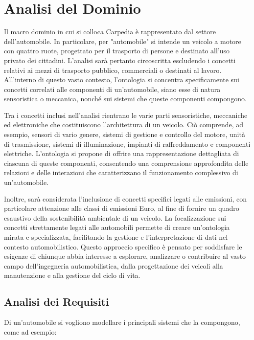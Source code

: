 \chapter{Analisi del Dominio}

Il macro dominio in cui si colloca Carpedia è rappresentato dal settore dell'automobile. In particolare, per "automobile" si intende un veicolo a motore con quattro ruote, progettato per il trasporto di persone e destinato all'uso privato dei cittadini. L'analisi sarà pertanto circoscritta escludendo i concetti relativi ai mezzi di trasporto pubblico, commerciali o destinati al lavoro. All'interno di questo vasto contesto, l'ontologia si concentra specificamente sui concetti correlati alle componenti di un'automobile, siano esse di natura sensoristica o meccanica, nonché sui sistemi che queste componenti compongono.

Tra i concetti inclusi nell'analisi rientrano le varie parti sensoristiche, meccaniche ed elettroniche che costituiscono l'architettura di un veicolo. Ciò comprende, ad esempio, sensori di vario genere, sistemi di gestione e controllo del motore, unità di trasmissione, sistemi di illuminazione, impianti di raffreddamento e componenti elettriche. L'ontologia si propone di offrire una rappresentazione dettagliata di ciascuna di queste componenti, consentendo una comprensione approfondita delle relazioni e delle interazioni che caratterizzano il funzionamento complessivo di un'automobile.

Inoltre, sarà considerata l'inclusione di concetti specifici legati alle emissioni, con particolare attenzione alle classi di emissioni Euro, al fine di fornire un quadro esaustivo della sostenibilità ambientale di un veicolo. La focalizzazione sui concetti strettamente legati alle automobili permette di creare un'ontologia mirata e specializzata, facilitando la gestione e l'interpretazione di dati nel contesto automobilistico. Questo approccio specifico è pensato per soddisfare le esigenze di chiunque abbia interesse a esplorare, analizzare o contribuire al vasto campo dell'ingegneria automobilistica, dalla progettazione dei veicoli alla manutenzione e alla gestione del ciclo di vita.

\section{Analisi dei Requisiti}
Di un'automobile si vogliono modellare i principali sistemi che la compongono, come ad esempio:

